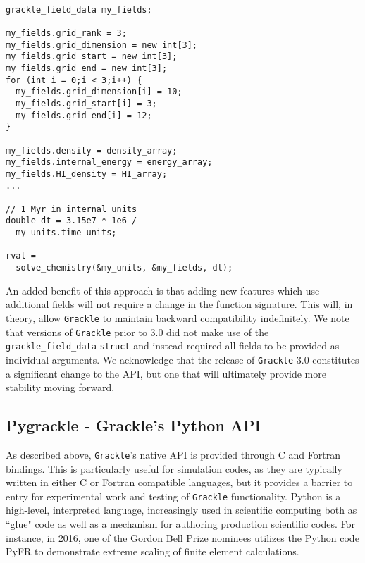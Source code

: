 \vspace{0.5cm}
\begin{minipage}[b]{0.5\linewidth}
\begin{verbatim}

grackle_field_data my_fields;

my_fields.grid_rank = 3;
my_fields.grid_dimension = new int[3];
my_fields.grid_start = new int[3];
my_fields.grid_end = new int[3];
for (int i = 0;i < 3;i++) {
  my_fields.grid_dimension[i] = 10;
  my_fields.grid_start[i] = 3;
  my_fields.grid_end[i] = 12;
}

my_fields.density = density_array;
my_fields.internal_energy = energy_array;
my_fields.HI_density = HI_array;
...

// 1 Myr in internal units
double dt = 3.15e7 * 1e6 /
  my_units.time_units;

rval =
  solve_chemistry(&my_units, &my_fields, dt);

\end{verbatim}
\end{minipage}

An added benefit of this approach is that adding new
features which use additional fields will not require a change in the
function signature.  This will, in theory, allow \texttt{Grackle} to maintain
backward compatibility indefinitely.  We note that versions of \texttt{Grackle}
prior to 3.0 did not make use of the \texttt{grackle\_field\_data}
\texttt{struct} and instead required all fields to be provided as
individual arguments.  We acknowledge that the release of
\texttt{Grackle} 3.0 constitutes a significant change to the API, but
one that will ultimately provide more stability moving forward.

\subsection{Pygrackle - Grackle's Python API}

As described above, \texttt{Grackle}'s native API is provided through C and Fortran
bindings.  This is particularly useful for simulation codes, as they are
typically written in either C or Fortran compatible languages, but it provides
a barrier to entry for experimental work and testing of \texttt{Grackle} functionality.
Python is a high-level, interpreted language, increasingly used in scientific
computing both as ``glue" code as well as a mechanism for authoring production
scientific codes.  For instance, in 2016, one of the Gordon Bell Prize nominees
utilizes the Python code PyFR to demonstrate extreme scaling of finite element
calculations.

